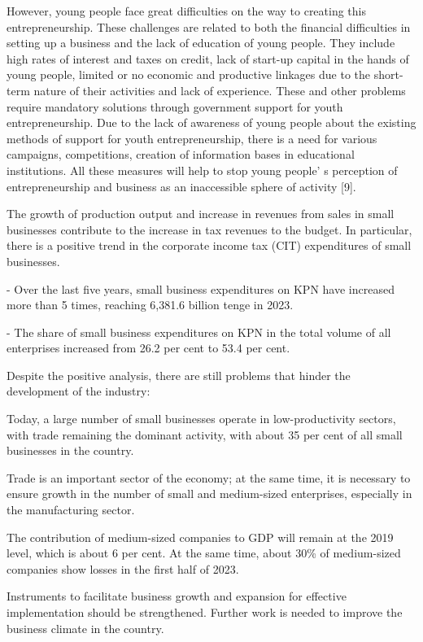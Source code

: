 \begin{multicols}{2}
However, young people face great difficulties on the way to creating
this entrepreneurship. These challenges are related to both the
financial difficulties in setting up a business and the lack of
education of young people. They include high rates of interest and taxes
on credit, lack of start-up capital in the hands of young people,
limited or no economic and productive linkages due to the short-term
nature of their activities and lack of experience. These and other
problems require mandatory solutions through government support for
youth entrepreneurship. Due to the lack of awareness of young people
about the existing methods of support for youth entrepreneurship, there
is a need for various campaigns, competitions, creation of information
bases in educational institutions. All these measures will help to stop
young people' s perception of entrepreneurship and
business as an inaccessible sphere of activity {[}9{]}.

The growth of production output and increase in revenues from sales in
small businesses contribute to the increase in tax revenues to the
budget. In particular, there is a positive trend in the corporate income
tax (CIT) expenditures of small businesses.

- Over the last five years, small business expenditures on KPN have
increased more than 5 times, reaching 6,381.6 billion tenge in 2023.

- The share of small business expenditures on KPN in the total volume of
all enterprises increased from 26.2 per cent to 53.4 per cent.

Despite the positive analysis, there are still problems that hinder the
development of the industry:

Today, a large number of small businesses operate in low-productivity
sectors, with trade remaining the dominant activity, with about 35 per
cent of all small businesses in the country.

Trade is an important sector of the economy; at the same time, it is
necessary to ensure growth in the number of small and medium-sized
enterprises, especially in the manufacturing sector.

The contribution of medium-sized companies to GDP will remain at the
2019 level, which is about 6 per cent. At the same time, about 30\% of
medium-sized companies show losses in the first half of 2023.

Instruments to facilitate business growth and expansion for effective
implementation should be strengthened. Further work is needed to improve
the business climate in the country.


\end{multicols}
